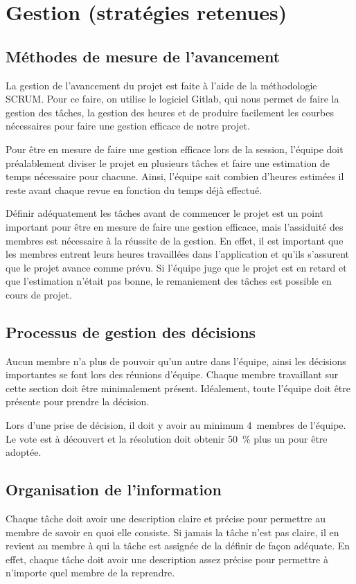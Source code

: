 \section{Gestion (stratégies retenues)}
	\subsection{Méthodes de mesure de l'avancement}
	La gestion de l’avancement du projet est faite à l’aide de la méthodologie SCRUM. Pour ce faire, on utilise le logiciel Gitlab, qui nous permet de faire la gestion des tâches, la gestion des heures et de produire facilement les courbes nécessaires pour faire une gestion efficace de notre projet.
 
	Pour être en mesure de faire une gestion efficace lors de la session, l’équipe doit préalablement diviser le projet en plusieurs tâches et faire une estimation de temps nécessaire pour chacune. Ainsi, l’équipe sait combien d’heures estimées il reste avant chaque revue en fonction du temps déjà effectué.
 
	Définir adéquatement les tâches avant de commencer le projet est un point important pour être en mesure de faire une gestion efficace, mais l’assiduité des membres est nécessaire à la réussite de la gestion. En effet, il est important que les membres entrent leurs heures travaillées dans l’application et qu’ils s’assurent que le projet avance comme prévu. Si l’équipe juge que le projet est en retard et que l’estimation n’était pas bonne, le remaniement des tâches est possible en cours de projet. 

	\subsection{Processus de gestion des décisions}
	Aucun membre n’a plus de pouvoir qu’un autre dans l’équipe, ainsi les décisions importantes se font lors des réunions d’équipe. Chaque membre travaillant sur cette section doit être minimalement présent. Idéalement, toute l’équipe doit être présente pour prendre la décision.
 
	Lors d’une prise de décision, il doit y avoir au minimum 4~membres de l’équipe. Le vote est à découvert et la résolution doit obtenir 50~\% plus un pour être adoptée.

	\subsection{Organisation de l'information}
	Chaque tâche doit avoir une description claire et précise pour permettre au membre de savoir en quoi elle consiste. Si jamais la tâche n’est pas claire, il en revient au membre à qui la tâche est assignée de la définir de façon adéquate. En effet, chaque tâche doit avoir une description assez précise pour permettre à n’importe quel membre de la reprendre.


